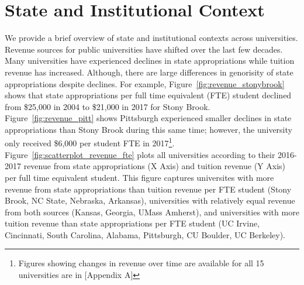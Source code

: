 \documentclass[twoside]{article}
\begin{document}
\section*{State and Institutional Context}
We provide a brief overview of state and institutional contexts across universities. Revenue sources for public universities have shifted over the last few decades. Many universities have experienced declines in state appropriations while tuition revenue has increased. Although, there are large differences in genorisity of state appropriations despite declines. For example, Figure~\ref{fig:revenue_stonybrook} shows that state appropriations per full time equivalent (FTE) student declined from \$25,000 in 2004 to \$21,000 in 2017 for Stony Brook. Figure~\ref{fig:revenue_pitt} shows Pittsburgh experienced smaller declines in state appropriations than Stony Brook during this same time; however, the university only received \$6,000 per student FTE in 2017\footnote{Figures showing changes in revenue over time are available for all 15 universities are in [Appendix A]}. Figure~\ref{fig:scatterplot_revenue_fte} plots all universities according to their 2016-2017 revenue from state appropriations (X Axis) and tuition revenue (Y Axis) per full time equivalent student. This figure captures universites with more revenue from state appropriations than tuition revenue per FTE student (Stony Brook, NC State, Nebraska, Arkansas), universities with relatively equal revenue from both sources (Kansas, Georgia, UMass Amherst), and universities with more tuition revenue than state appropriations per FTE student (UC Irvine, Cincinnati, South Carolina, Alabama, Pittsburgh, CU Boulder, UC Berkeley).


\end{document}
